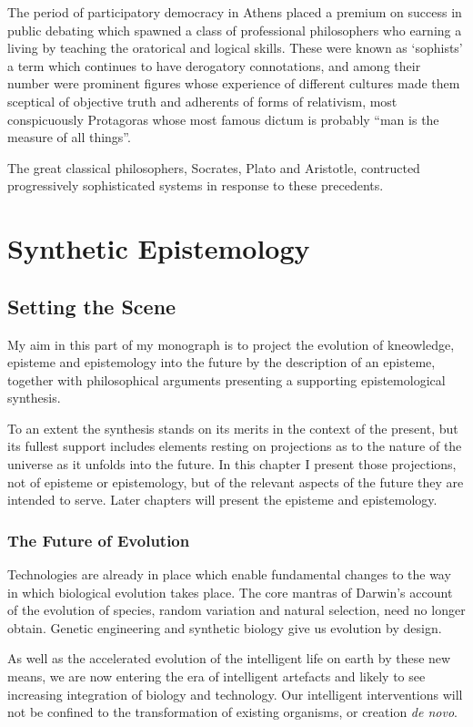 \documentclass[10pt,titlepage]{book}
\begin{document}
The period of participatory democracy in Athens placed a premium on success in public debating which spawned a class of professional philosophers who earning a living by teaching the oratorical and logical skills.
These were known as `sophists' a term which continues to have derogatory connotations, and among their number were prominent figures whose experience of different cultures made them sceptical of objective truth and adherents of forms of relativism, most conspicuously Protagoras whose most famous dictum is probably ``man is the measure of all things''.

The great classical philosophers, Socrates, Plato and Aristotle, contructed progressively sophisticated systems in response to these precedents.

\part{Synthetic Epistemology}

\chapter{Setting the Scene}

My aim in this part of my monograph is to project the evolution of kneowledge, episteme and epistemology into the future by the description of an episteme, together with philosophical arguments presenting a supporting epistemological synthesis.

To an extent the synthesis stands on its merits in the context of the present, but its fullest support includes elements resting on projections as to the nature of the universe as it unfolds into the future.
In this chapter I present those projections, not of episteme or epistemology, but of the relevant aspects of the future they are intended to serve.
Later chapters will present the episteme and epistemology.

\section{The Future of Evolution}

Technologies are already in place which enable fundamental changes to the way in which biological evolution takes place.
The core mantras of Darwin's account of the evolution of species, random variation and natural selection, need no longer obtain.
Genetic engineering and synthetic biology give us evolution by design.

As well as the accelerated evolution of the intelligent life on earth by these new means, we are now entering the era of intelligent artefacts and likely to see increasing integration of biology and technology.
Our intelligent interventions will not be confined to the transformation of existing organisms, or creation \emph{de novo}.
\end{document}
